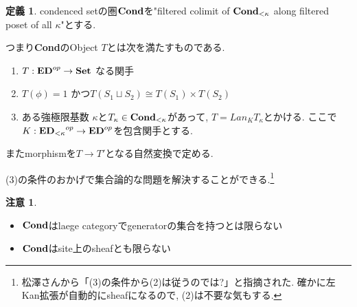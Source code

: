 \documentclass[dvipdfmx,a4paper,11pt]{article}
\theoremstyle{definition}
\newtheorem{dfn}[thm]{定義}
\newtheorem{rem}[thm]{注意}
\begin{document}
\begin{tcolorbox}
 [colback = white, colframe = green!35!black, fonttitle = \bfseries,breakable = true]
\begin{dfn}\cite[Definition 2.11]{Sch19}
\label{dfn-Sch19-Def2.11}
condenced setの圏${\bf Cond}$を"filtered colimit of ${\bf Cond_{<\kappa}}$ along filtered poset of all $\kappa$"とする.

つまり{\bf Cond}のObject $T$とは次を満たすものである.
\begin{enumerate}
\item $T : {\bf ED}^{op} \to {\bf Set}$ なる関手
\item $T(\phi)=1$ かつ$T(S_1\sqcup S_2) \cong T(S_1) \times T(S_2)$
\item ある強極限基数 $\kappa$と$T_{\kappa} \in {\bf Cond}_{<\kappa}$があって, $T = Lan_{K}T_{\kappa}$とかける. ここで$K : {{\bf ED}_{<\kappa}}^{op} \to {\bf ED}^{op}$を包含関手とする.
\end{enumerate}
またmorphismを$T \to T'$となる自然変換で定める.
\end{dfn}
 \end{tcolorbox}
 (3)の条件のおかげで集合論的な問題を解決することができる.\footnote{松澤さんから「(3)の条件から(2)は従うのでは?」と指摘された. 確かに左Kan拡張が自動的にsheafになるので, (2)は不要な気もする.}
 



\begin{rem}\cite[Remark 2.12, 2.13]{Sch19}
\begin{itemize}
\item ${\bf Cond}$はlaege categoryでgeneratorの集合を持つとは限らない
\item ${\bf Cond}$はsite上のsheafとも限らない
\end{itemize}
\end{rem}
\end{document}
